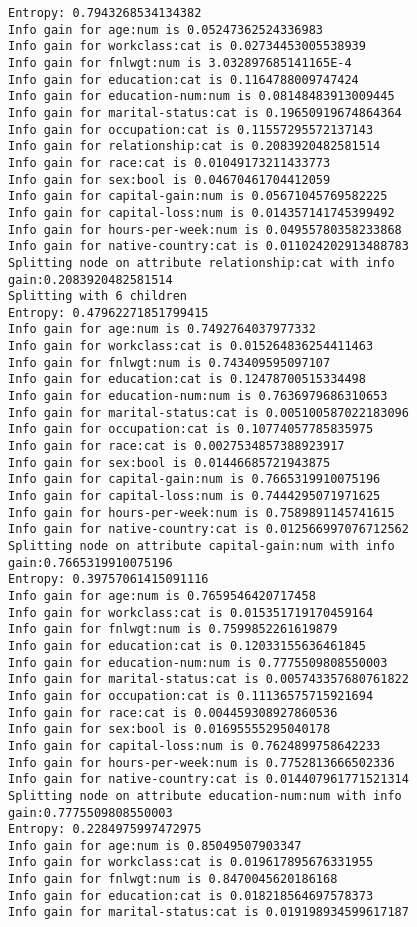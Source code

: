 \documentclass[a4paper,11pt,titlepage]{article}
\begin{document}
\begin{verbatim}
Entropy: 0.7943268534134382
Info gain for age:num is 0.05247362524336983
Info gain for workclass:cat is 0.02734453005538939
Info gain for fnlwgt:num is 3.032897685141165E-4
Info gain for education:cat is 0.1164788009747424
Info gain for education-num:num is 0.08148483913009445
Info gain for marital-status:cat is 0.19650919674864364
Info gain for occupation:cat is 0.11557295572137143
Info gain for relationship:cat is 0.2083920482581514
Info gain for race:cat is 0.01049173211433773
Info gain for sex:bool is 0.04670461704412059
Info gain for capital-gain:num is 0.05671045769582225
Info gain for capital-loss:num is 0.014357141745399492
Info gain for hours-per-week:num is 0.04955780358233868
Info gain for native-country:cat is 0.011024202913488783
Splitting node on attribute relationship:cat with info gain:0.2083920482581514
Splitting with 6 children
Entropy: 0.47962271851799415
Info gain for age:num is 0.7492764037977332
Info gain for workclass:cat is 0.015264836254411463
Info gain for fnlwgt:num is 0.743409595097107
Info gain for education:cat is 0.12478700515334498
Info gain for education-num:num is 0.7636979686310653
Info gain for marital-status:cat is 0.005100587022183096
Info gain for occupation:cat is 0.10774057785835975
Info gain for race:cat is 0.0027534857388923917
Info gain for sex:bool is 0.01446685721943875
Info gain for capital-gain:num is 0.7665319910075196
Info gain for capital-loss:num is 0.7444295071971625
Info gain for hours-per-week:num is 0.7589891145741615
Info gain for native-country:cat is 0.012566997076712562
Splitting node on attribute capital-gain:num with info gain:0.7665319910075196
Entropy: 0.39757061415091116
Info gain for age:num is 0.7659546420717458
Info gain for workclass:cat is 0.015351719170459164
Info gain for fnlwgt:num is 0.7599852261619879
Info gain for education:cat is 0.12033155636461845
Info gain for education-num:num is 0.7775509808550003
Info gain for marital-status:cat is 0.005743357680761822
Info gain for occupation:cat is 0.11136575715921694
Info gain for race:cat is 0.004459308927860536
Info gain for sex:bool is 0.01695555295040178
Info gain for capital-loss:num is 0.7624899758642233
Info gain for hours-per-week:num is 0.7752813666502336
Info gain for native-country:cat is 0.014407961771521314
Splitting node on attribute education-num:num with info gain:0.7775509808550003
Entropy: 0.2284975997472975
Info gain for age:num is 0.85049507903347
Info gain for workclass:cat is 0.019617895676331955
Info gain for fnlwgt:num is 0.8470045620186168
Info gain for education:cat is 0.018218564697578373
Info gain for marital-status:cat is 0.019198934599617187

\end{verbatim}
\end{document}
